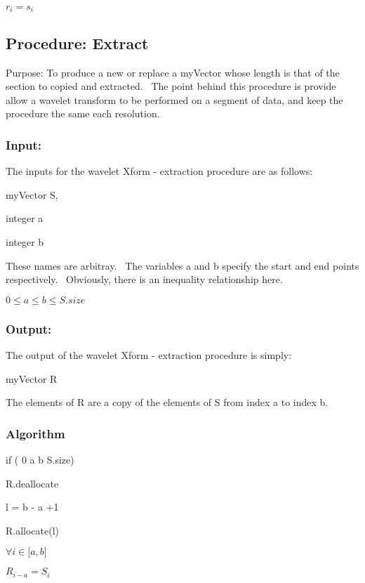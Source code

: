 \documentclass{article}
\begin{document}
\qquad \qquad \qquad $r_{i}=s_{i}$

\bigskip 

\subsection{Procedure: Extract}

Purpose: To produce a new or replace a myVector whose length is that of the
section to copied and extracted. \ The point behind this procedure is
provide allow a wavelet transform to be performed on a segment of data, and
keep the procedure the same each resolution. \ 

\bigskip 

\subsubsection{Input:}

The inputs for the wavelet Xform -\TEXTsymbol{>} extraction procedure are as
follows:

\qquad myVector S, 

\qquad integer a \ 

\qquad integer b \ 

These names are arbitray. \ The variables a and b specify the start and end
points respectively. \ Obviously, there is an inequality relationship here.

\qquad $0\leq a\leq b\leq S.size$

\bigskip 

\subsubsection{Output:}

The output of the wavelet Xform -\TEXTsymbol{>} extraction procedure is
simply:

\qquad myVector R

The elements of R are a copy of the elements of S from index a to index b.

\bigskip 

\subsubsection{Algorithm}

\qquad if ( 0 \TEXTsymbol{<} a \TEXTsymbol{<} b \TEXTsymbol{<} S.size)

\qquad \qquad R.deallocate

\qquad \qquad l = b - a +1

\qquad \qquad R.allocate(l)

\qquad \qquad $\forall i\in \lbrack a,b]$

\qquad \qquad \qquad $R_{i-a}=S_{i}$

\bigskip 

\qquad 
\end{document}
